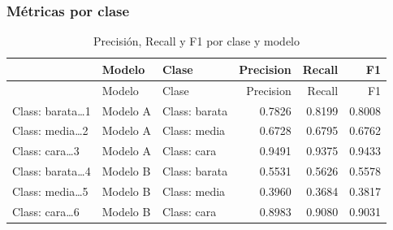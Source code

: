 \documentclass[
]{article}
\newenvironment{Shaded}{\begin{snugshade}}{\end{snugshade}}
\newcommand{\AttributeTok}[1]{\textcolor[rgb]{0.13,0.29,0.53}{#1}}
\newcommand{\DecValTok}[1]{\textcolor[rgb]{0.00,0.00,0.81}{#1}}
\newcommand{\FunctionTok}[1]{\textcolor[rgb]{0.13,0.29,0.53}{\textbf{#1}}}
\newcommand{\NormalTok}[1]{#1}
\newcommand{\OtherTok}[1]{\textcolor[rgb]{0.56,0.35,0.01}{#1}}
\newcommand{\SpecialCharTok}[1]{\textcolor[rgb]{0.81,0.36,0.00}{\textbf{#1}}}
\newcommand{\StringTok}[1]{\textcolor[rgb]{0.31,0.60,0.02}{#1}}
\begin{document}
\hypertarget{muxe9tricas-por-clase}{%
\subsubsection{Métricas por clase}\label{muxe9tricas-por-clase}}

\begin{Shaded}
\end{Shaded}

\begin{longtable}[]{@{}lllrrr@{}}
\caption{Precisión, Recall y F1 por clase y modelo}\tabularnewline
\toprule\noalign{}
& Modelo & Clase & Precision & Recall & F1 \\
\midrule\noalign{}
\endfirsthead
\toprule\noalign{}
& Modelo & Clase & Precision & Recall & F1 \\
\midrule\noalign{}
\endhead
\bottomrule\noalign{}
\endlastfoot
Class: barata\ldots1 & Modelo A & Class: barata & 0.7826 & 0.8199 &
0.8008 \\
Class: media\ldots2 & Modelo A & Class: media & 0.6728 & 0.6795 &
0.6762 \\
Class: cara\ldots3 & Modelo A & Class: cara & 0.9491 & 0.9375 &
0.9433 \\
Class: barata\ldots4 & Modelo B & Class: barata & 0.5531 & 0.5626 &
0.5578 \\
Class: media\ldots5 & Modelo B & Class: media & 0.3960 & 0.3684 &
0.3817 \\
Class: cara\ldots6 & Modelo B & Class: cara & 0.8983 & 0.9080 &
0.9031 \\
\end{longtable}
\end{document}
